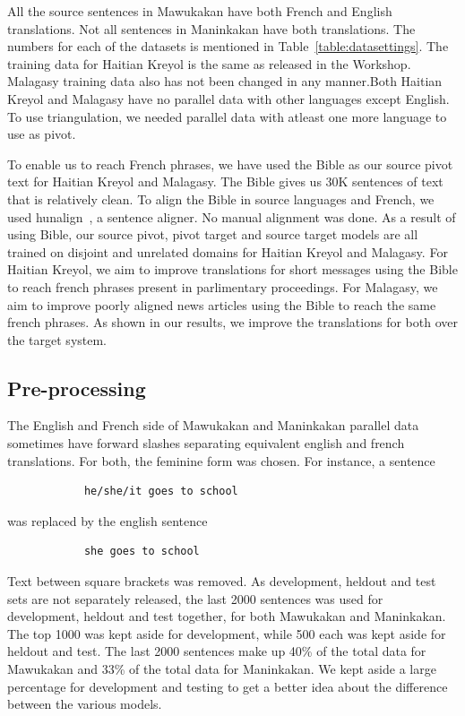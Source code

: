 

All the source sentences in Mawukakan have both French and English translations. Not all sentences in Maninkakan have both translations. The numbers for each of the datasets is mentioned in Table~\ref{table:datasettings}. The training data for Haitian Kreyol is the same as released in the Workshop. Malagasy training data also has not been changed in any manner.Both Haitian Kreyol and Malagasy have no parallel data with other languages except English. To use triangulation, we needed parallel data with atleast one more language to use as pivot. 

To enable us to reach French phrases, we have used the Bible as our source pivot text for Haitian Kreyol and Malagasy. The Bible gives us 30K sentences of text that is relatively clean. To align the Bible in source languages and French, we used hunalign~\cite{Hun:05}, a sentence aligner. No manual alignment was done. As a result of using Bible, our source pivot, pivot target and source target models are all trained on disjoint and unrelated domains for Haitian Kreyol and Malagasy. For Haitian Kreyol, we aim to improve translations for short messages using the Bible to reach french phrases present in parlimentary proceedings. For Malagasy, we aim to improve poorly aligned news articles using the Bible to reach the same french phrases. As shown in our results, we improve the translations for both over the target system. 

\subsection{Pre-processing}

    The English and French side of Mawukakan and Maninkakan parallel data sometimes have forward slashes separating equivalent english and french translations. For both, the feminine form was chosen. For instance, a sentence
    \begin{verbatim}
            he/she/it goes to school
    \end{verbatim}
            was replaced by the english sentence \\
    \begin{verbatim}
            she goes to school
    \end{verbatim}

    Text between square brackets was removed. As development, heldout and test sets are not separately released, the last 2000 sentences was used for development, heldout and test together, for both Mawukakan and Maninkakan. The top 1000 was kept aside for development, while 500 each was kept aside for heldout and test. The last 2000 sentences make up 40\% of the total data for Mawukakan and 33\% of the total data for Maninkakan. We kept aside a large percentage for development and testing to get a better idea about the difference between the various models.

